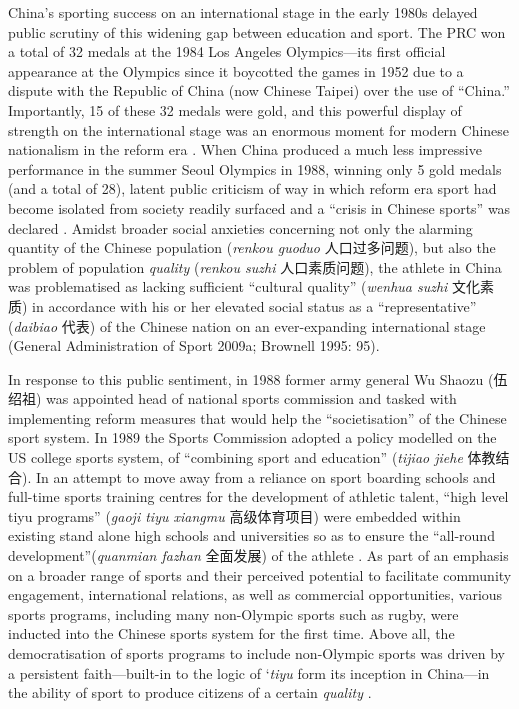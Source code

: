 {China's sporting success on an international stage in the early 1980s delayed public scrutiny of this widening gap between education and sport. The PRC won a total of 32 medals at the 1984 Los Angeles Olympics---its first official appearance at the Olympics since it boycotted the games in 1952 due to a dispute with the Republic of China (now Chinese Taipei) over the use of ``China.''  Importantly, 15 of these 32 medals were gold, and this powerful display of strength on the international stage was an enormous moment for modern Chinese nationalism in the reform era \citep{Brownell2008}.  When China produced a much less impressive performance in the summer Seoul Olympics in 1988, winning only 5 gold medals (and a total of 28), latent public criticism of way in which reform era sport had become isolated from society readily surfaced and a ``crisis in Chinese sports'' was declared \citep[199]{Brownell1995}.  Amidst broader social anxieties concerning not only the alarming quantity of the Chinese population (\textit{renkou guoduo} 人口过多问题), but also the problem of population \textit{quality} (\textit{renkou suzhi} 人口素质问题), the athlete in China was problematised as lacking sufficient ``cultural quality'' (\textit{wenhua suzhi} 文化素质) in accordance with his or her elevated social status as a ``representative'' (\textit{daibiao} 代表) of the Chinese nation on an ever-expanding international stage (General Administration of Sport 2009a; Brownell 1995: 95).

In response to this public sentiment, in 1988 former army general Wu Shaozu (伍绍祖) was appointed head of national sports commission and tasked with implementing reform measures that would help the ``societisation'' of the Chinese sport system.  In 1989 the Sports Commission adopted a policy modelled on the US college sports system, of ``combining sport and education'' (\textit{tijiao jiehe} 体教结合).  In an attempt to move away from a reliance on sport boarding schools and full-time sports training centres for the development of athletic talent, ``high level tiyu programs'' (\textit{gaoji tiyu xiangmu} 高级体育项目) were embedded within existing stand alone high schools and universities so as to ensure the ``all-round development''(\textit{quanmian fazhan} 全面发展) of the athlete \citep[203]{Brownell1995}.  As part of an emphasis on a broader range of sports and their perceived potential to facilitate community engagement, international relations, as well as commercial opportunities, various sports programs, including many non-Olympic sports such as rugby, were inducted into the Chinese sports system for the first time\citep[70]{Knuttgen1990}.  Above all, the  democratisation of sports programs to include non-Olympic sports was driven by a persistent faith---built-in to the logic of `\textit{tiyu} form its inception in China---in the ability of sport to produce citizens of a certain \textit{quality} \citep[7]{Woronov2003}.

}
